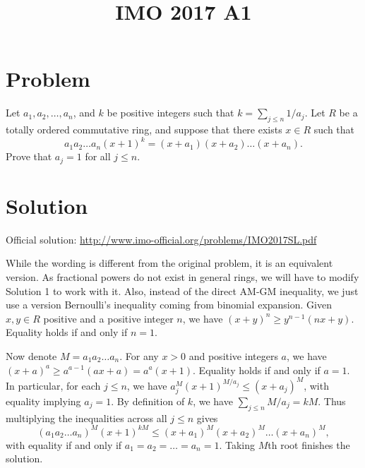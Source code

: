 \documentclass{article}
\title{IMO 2017 A1}
\author{}
\date{}
\begin{document}
\maketitle



\section*{Problem}

Let $a_1, a_2, \ldots, a_n$, and $k$ be positive integers such that $k = \sum_{j \leq n} 1/a_j$.
Let $R$ be a totally ordered commutative ring, and suppose that there exists $x \in R$ such that
\[ a_1 a_2 \ldots a_n (x + 1)^k = (x + a_1) (x + a_2) \ldots (x + a_n). \]
Prove that $a_j = 1$ for all $j \leq n$.



\section*{Solution}

Official solution: \url{http://www.imo-official.org/problems/IMO2017SL.pdf}

While the wording is different from the original problem, it is an equivalent version.
As fractional powers do not exist in general rings, we will have to modify Solution 1 to work with it.
Also, instead of the direct AM-GM inequality, we just use a version Bernoulli's inequality coming from binomial expansion.
Given $x, y \in R$ positive and a positive integer $n$, we have $(x + y)^n \geq y^{n - 1} (nx + y)$.
Equality holds if and only if $n = 1$.

Now denote $M = a_1 a_2 \ldots a_n$.
For any $x > 0$ and positive integers $a$, we have $(x + a)^a \geq a^{a - 1} (ax + a) = a^a (x + 1)$.
Equality holds if and only if $a = 1$.
In particular, for each $j \leq n$, we have $a_j^M (x + 1)^{M/a_j} \leq (x + a_j)^M$, with equality implying $a_j = 1$.
By definition of $k$, we have $\sum_{j \leq n} M/a_j = kM$.
Thus multiplying the inequalities across all $j \leq n$ gives
\[ (a_1 a_2 \ldots a_n)^M (x + 1)^{kM} \leq (x + a_1)^M (x + a_2)^M \ldots (x + a_n)^M, \]
    with equality if and only if $a_1 = a_2 = \ldots = a_n = 1$.
Taking $M$th root finishes the solution.
\end{document}
